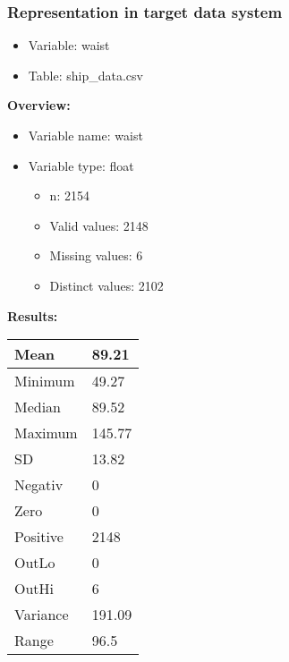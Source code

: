 \documentclass[
]{article}
\providecommand{\tightlist}{%
  \setlength{\itemsep}{0pt}\setlength{\parskip}{0pt}}
\begin{document}
\newpage

\hypertarget{representation-in-target-data-system-27}{%
\subsubsection{\texorpdfstring{Representation in \textbf{target} data
system}{Representation in target data system}}\label{representation-in-target-data-system-27}}

\begin{itemize}
\tightlist
\item
  Variable: waist
\item
  Table: ship\_data.csv
\end{itemize}

\textbf{Overview:}

\begin{itemize}
\tightlist
\item
  Variable name: waist
\item
  Variable type: float

  \begin{itemize}
  \tightlist
  \item
    n: 2154
  \item
    Valid values: 2148
  \item
    Missing values: 6
  \item
    Distinct values: 2102
  \end{itemize}
\end{itemize}

\textbf{Results:}\\

\begin{table}[H]
\centering
\begin{tabular}{l|l}
\hline
Mean & 89.21\\
\hline
Minimum & 49.27\\
\hline
Median & 89.52\\
\hline
Maximum & 145.77\\
\hline
SD & 13.82\\
\hline
Negativ & 0\\
\hline
Zero & 0\\
\hline
Positive & 2148\\
\hline
OutLo & 0\\
\hline
OutHi & 6\\
\hline
Variance & 191.09\\
\hline
Range & 96.5\\
\hline
\end{tabular}
\end{table}
\end{document}
